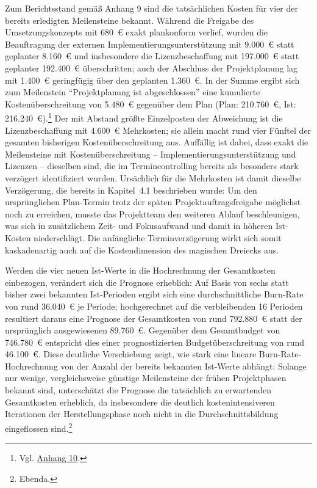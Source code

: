 \documentclass[
    12pt, 
    a4paper,
    ]{scrartcl} %
\begin{document}
Zum Berichtsstand gemäß Anhang 9 sind die tatsächlichen Kosten für vier der bereits erledigten Meilensteine bekannt. Während die Freigabe des Umsetzungskonzepts mit 680~€ exakt plankonform verlief, wurden die Beauftragung der externen Implementierungsunterstützung mit 9.000~€ statt geplanter 8.160~€ und insbesondere die Lizenzbeschaffung mit 197.000~€ statt geplanter 192.400~€ überschritten; auch der Abschluss der Projektplanung lag mit 1.400~€ geringfügig über den geplanten 1.360~€. In der Summe ergibt sich zum Meilenstein ``Projektplanung ist abgeschlossen'' eine kumulierte Kostenüberschreitung von 5.480~€ gegenüber dem Plan (Plan: 210.760~€, Ist: 216.240~€).\footnote{Vgl. \hyperref[sec:Anhang10]{Anhang 10}.} Der mit Abstand größte Einzelposten der Abweichung ist die Lizenzbeschaffung mit 4.600~€ Mehrkosten; sie allein macht rund vier Fünftel der gesamten bisherigen Kostenüberschreitung aus. Auffällig ist dabei, dass exakt die Meilensteine mit Kostenüberschreitung -- Implementierungsunterstützung und Lizenzen -- dieselben sind, die im Termincontrolling bereits als besonders stark verzögert identifiziert wurden. Ursächlich für die Mehrkosten ist damit dieselbe Verzögerung, die bereits in Kapitel~4.1 beschrieben wurde: Um den ursprünglichen Plan-Termin trotz der späten Projektauftragsfreigabe möglichst noch zu erreichen, musste das Projektteam den weiteren Ablauf beschleunigen, was sich in zusätzlichem Zeit- und Fokusaufwand und damit in höheren Ist-Kosten niederschlägt. Die anfängliche Terminverzögerung wirkt sich somit kaskadenartig auch auf die Kostendimension des magischen Dreiecks aus.

Werden die vier neuen Ist-Werte in die Hochrechnung der Gesamtkosten einbezogen, verändert sich die Prognose erheblich: Auf Basis von sechs statt bisher zwei bekannten Ist-Perioden ergibt sich eine durchschnittliche Burn-Rate von rund 36.040~€ je Periode; hochgerechnet auf die verbleibenden 16 Perioden resultiert daraus eine Prognose der Gesamtkosten von rund 792.880~€ statt der ursprünglich ausgewiesenen 89.760~€. Gegenüber dem Gesamtbudget von 746.780~€ entspricht dies einer prognostizierten Budgetüberschreitung von rund 46.100~€. Diese deutliche Verschiebung zeigt, wie stark eine lineare Burn-Rate-Hochrechnung von der Anzahl der bereits bekannten Ist-Werte abhängt: Solange nur wenige, vergleichsweise günstige Meilensteine der frühen Projektphasen bekannt sind, unterschätzt die Prognose die tatsächlich zu erwartenden Gesamtkosten erheblich, da insbesondere die deutlich kostenintensiveren Iterationen der Herstellungsphase noch nicht in die Durchschnittsbildung eingeflossen sind.\footnote{Ebenda.}
\end{document}
